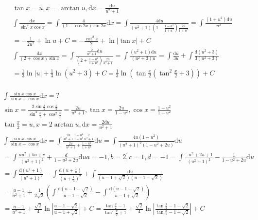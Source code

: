 \documentclass{article}
\begin{document}
\begin{align*}
    \tan x = u ,x =\arctan u , \mathrm{d}x = \frac{\mathrm{d}u}{u^2+1} \\
    \int \frac{\mathrm{d}x}{\sin^3 x \cos x} = \int \frac{4}{(1-\cos 2x)\sin 2x} \mathrm{d}x = \int \frac{4\mathrm{d}u}{(u^2+1)(1-\frac{1-u^2}{1+u^2})\frac{2u}{1+u^2}} = \int \frac{(1+u^2)\mathrm{d}u}{u^3} \\ 
    = -\frac{1}{2u^2} + \ln u + C = -\frac{\cot^2 x}{2} + \ln |\tan x| + C\\
    \int \frac{\mathrm{d}x }{(2+\cos x)\sin x} = \int \frac{\frac{2}{u^2+1} \mathrm{d}u}{(2+\frac{1-u^2}{1+u^2})\frac{2u}{u^2+1}} = \int \frac{(u^2+1)\mathrm{d}u}{(u^2+3)u} = \int \frac{\mathrm{d}u}{3u} + \int \frac{\mathrm{d}(u^2+3)}{3(u^2+3)} \\ 
    = \frac{1}{3}\ln |u| + \frac{1}{3}\ln (u^2+3) + C = \frac{1}{3}\ln\left(\tan \frac{x}{2}(\tan^2 \frac{x}{2}+3)\right) + C \\ 
\end{align*}

\clearpage
\begin{align*}
    \int \frac{\sin x \cos x}{\sin x + \cos x} \mathrm{d}x = ? \\
    \sin x = \frac{2\sin \frac{x}{2}\cos \frac{x}{2}}{\sin^2 \frac{x}{2} + \cos^2 \frac{x}{2}} = \frac{2u}{u^2 + 1} ,\tan x = \frac{2 u}{1 - u^2 } , \cos x = \frac{1 - u^2 }{1 + u^2 } \\
    \tan \frac{x}{2} = u , x = 2\arctan u ,\mathrm{d}x = \frac{2\mathrm{d}u}{u^2+1}\\
    \int \frac{\sin x\cos x}{\sin x + \cos x} \mathrm{d}x = \int \frac{\frac{2u}{u^2+1}\frac{1-u^2}{1+u^2}\frac{2}{u^2+1}}{\frac{2u}{u^2+1}+\frac{1-u^2}{1+u^2}}\mathrm{d}u = \int \frac{4u(1-u^2)}{(u^2+1)^2(1-u^2+2u)} \mathrm{d}u \\
    = \int \frac{au^2+bu+c }{(u^2+1)^2} + \frac{d}{1-u^2+2u} \mathrm{d} u  \underrightarrow{a = -1 ,b = 2,c= 1,d=-1 }= \int \frac{-u^2+2u+1 }{(u^2+1)^2} - \frac{1}{1-u^2+2u} \mathrm{d} u \\
    = \int \frac{\mathrm{d}(u^2+1)}{(u^2+1)^2} - \int \frac{\mathrm{d}\left(u+\frac{1}{u}\right)}{(u+\frac{1}{u})^2} + \int \frac{\mathrm{d} u}{(u-1+\sqrt{2})(u-1-\sqrt{2})} \\ 
    = \frac{u-1}{u^2+1} + \frac{1}{2\sqrt{2}}\left(\int \frac{\mathrm{d}(u-1-\sqrt{2})}{u-1-\sqrt{2}} - \int \frac{\mathrm{d}(u-1+\sqrt{2})}{u-1+\sqrt{2}}\right)\\
    = \frac{u-1}{u^2+1} + \frac{\sqrt{2}}{4}\ln\left|\frac{u-1-\sqrt{2}}{u-1+\sqrt{2}}\right|+ C = \frac{\tan \frac{x}{2}-1}{\tan^2 \frac{x}{2}+1} + \frac{\sqrt{2}}{4}\ln\left|\frac{\tan \frac{x}{2}-1-\sqrt{2}}{\tan \frac{x}{2} - 1+\sqrt{2}}\right|+ C \\
\end{align*}
\end{document}
